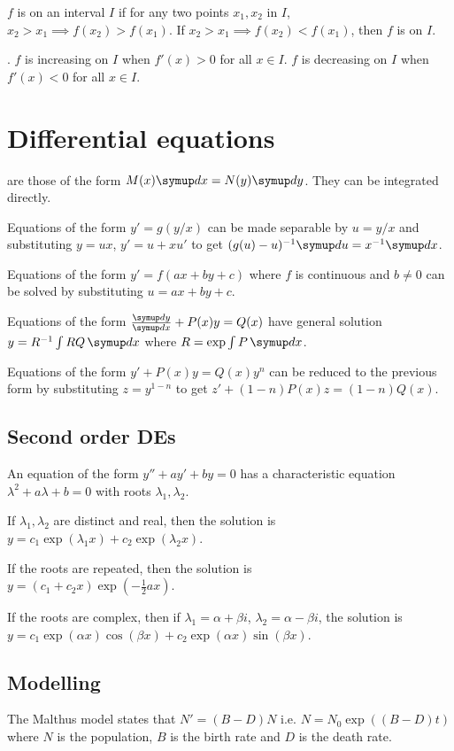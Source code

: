 \documentclass{slnotes}
\begin{document}
\(f\) is  on an interval \(I\) if for any two points \(x_1, x_2\) in \(I\), \(x_2 > x_1 \implies f(x_2) > f(x_1)\). If \(x_2 > x_1 \implies f(x_2) < f(x_1)\), then \(f\) is  on \(I\).

. \(f\) is increasing on \(I\) when \(f'(x) > 0\) for all \(x \in I\). \(f\) is decreasing on \(I\) when \(f'(x) < 0\) for all \(x \in I\).

\chapter{Differential equations}
 are those of the form \(M(x)\sld x = N(y)\sld y\). They can be integrated directly.

Equations of the form \(y' = g(y/x)\) can be made separable by \(u = y/x\) and substituting \(y = ux\), \(y' = u+xu'\) to get \((g(u) - u)^{-1}\sld u = x^{-1}\sld x\).

Equations of the form \(y' = f(ax + by + c)\) where \(f\) is continuous and \(b \neq 0\) can be solved by substituting \(u = ax + by + c\).

Equations of the form \(\sldd{y}{x} + P(x)y = Q(x)\) have general solution \(y = R^{-1}\int RQ\,\sld x\) where \(R = \exp \int P\,\sld x\).

Equations of the form \(y' + P(x)y = Q(x)y^n\) can be reduced to the previous form by substituting \(z = y^{1-n}\) to get \(z' + (1-n)P(x)z = (1-n)Q(x)\).

\section{Second order DEs}
An equation of the form \(y'' + ay' + by = 0\) has a characteristic equation \(\lambda^2 + a\lambda + b = 0\) with roots \(\lambda_1, \lambda_2\).

If \(\lambda_1, \lambda_2\) are distinct and real, then the solution is\\\(y = c_1\exp(\lambda_1x)+c_2\exp(\lambda_2x)\).

If the roots are repeated, then the solution is\\\(y = (c_1+c_2x)\exp(-\frac{1}{2}ax)\).

If the roots are complex, then if \(\lambda_1 = \alpha+\beta i\), \(\lambda_2 = \alpha-\beta i\), the solution is\\\(y = c_1\exp(\alpha x)\cos(\beta x)+c_2\exp(\alpha x)\sin(\beta x)\).

\section{Modelling}
The Malthus model states that \(N' = (B-D)N\) i.e. \(N = N_0\exp((B-D)t)\) where \(N\) is the population, \(B\) is the birth rate and \(D\) is the death rate.
\end{document}
